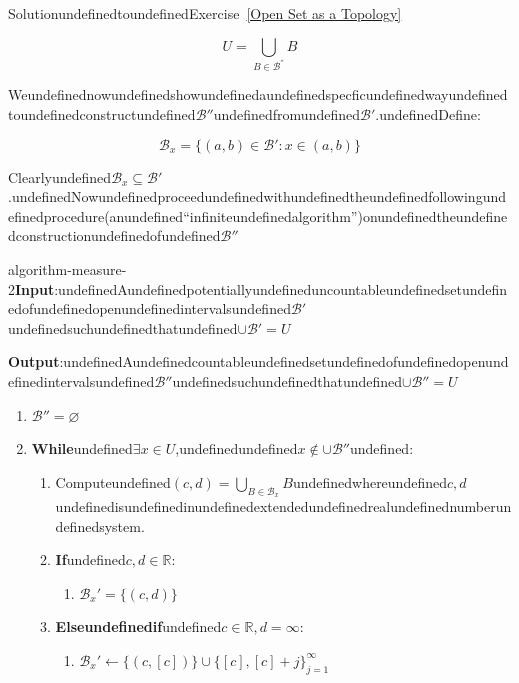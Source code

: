 \begin{mystsolution}{SolutionundefinedtoundefinedExercise~\ref{Open Set as a Topology}}
\begin{enumerate}[resume]
\begin{equation}
U=\bigcup_{B\in \mathcal B^{''}} B
\end{equation}


Weundefinednowundefinedshowundefinedaundefinedspecficundefinedwayundefinedtoundefinedconstructundefined$\mathcal B''$undefinedfromundefined$\mathcal B'$.undefinedDefine:

\begin{equation}
\mathcal B_x = \{(a,b)\in \mathcal B' : x\in (a,b)\}
\end{equation}


Clearlyundefined$\mathcal B_x \subseteq \mathcal B'$.undefinedNowundefinedproceedundefinedwithundefinedtheundefinedfollowingundefinedprocedure(anundefined``infiniteundefinedalgorithm'')onundefinedtheundefinedconstructionundefinedofundefined$\mathcal B''$
\end{enumerate}

\begin{mystthmalgorithm}{}{algorithm-measure-2}\textbf{Input}:undefinedAundefinedpotentiallyundefineduncountableundefinedsetundefinedofundefinedopenundefinedintervalsundefined$\mathcal B'$undefinedsuchundefinedthatundefined$\cup \mathcal B'=U$

\textbf{Output}:undefinedAundefinedcountableundefinedsetundefinedofundefinedopenundefinedintervalsundefined$\mathcal B''$undefinedsuchundefinedthatundefined$\cup \mathcal B''=U$

\begin{enumerate}
\item $\mathcal B'' = \varnothing$
\item \textbf{While}undefined$\exists x\in U$,undefinedundefined$x\notin \cup \mathcal B''$undefined:

\begin{enumerate}
\item Computeundefined$(c,d)=\bigcup_{B\in \mathcal B_x} B$undefinedwhereundefined$c,d$undefinedisundefinedinundefinedextendedundefinedrealundefinednumberundefinedsystem.
\item \textbf{If}undefined$c,d\in \mathbb{R}$:

\begin{enumerate}
\item $\mathcal{B}_x'=\{(c,d)\}$
\end{enumerate}


\item \textbf{Elseundefinedif}undefined$c\in \mathbb{R}, d=\infty$:

\begin{enumerate}
\item $\mathcal{B}_x'\gets \{(c,[c])\}\cup \{[c],[c]+j\}_{j=1}^{\infty}$
\end{enumerate}



\end{enumerate}
\end{enumerate}
\end{mystthmalgorithm}
\end{mystsolution}

